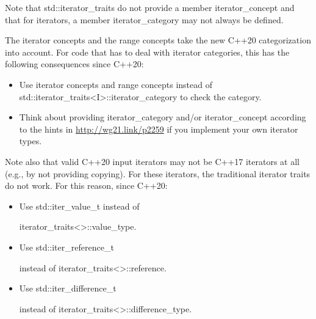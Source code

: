 Note that std::iterator\_traits do not provide a member iterator\_concept and that for iterators, a member iterator\_category may not always be defined.

The iterator concepts and the range concepts take the new C++20 categorization into account. For code that has to deal with iterator categories, this has the following consequences since C++20:

\begin{itemize}
\item
Use iterator concepts and range concepts instead of std::iterator\_traits<I>::iterator\_category to check the category.

\item
Think about providing iterator\_category and/or iterator\_concept according to the hints in \url{http://wg21.link/p2259} if you implement your own iterator types.
\end{itemize}

Note also that valid C++20 input iterators may not be C++17 iterators at all (e.g., by not providing copying). For these iterators, the traditional iterator traits do not work. For this reason, since C++20:

\begin{itemize}
\item
Use std::iter\_value\_t instead of

iterator\_traits<>::value\_type.

\item
Use std::iter\_reference\_t

instead of iterator\_traits<>::reference.

\item
Use std::iter\_difference\_t

instead of iterator\_traits<>::difference\_type.
\end{itemize}





















